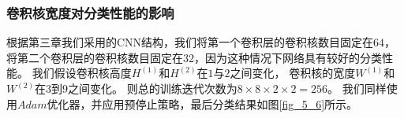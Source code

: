 \subsubsection{卷积核宽度对分类性能的影响}
根据第三章我们采用的CNN结构，我们将第一个卷积层的卷积核数目固定在$64$，
将第二个卷积层的卷积核数目固定在$32$，因为这种情况下网络具有较好的分类性能。
我们假设卷积核高度$H^{(1)}$和$H^{(2)}$在$1$与$2$之间变化，
卷积核的宽度$W^{(1)}$和$W^{(2)}$在$3$到$9$之间变化。
则总的训练迭代次数为$8 \times 8 \times 2 \times 2 = 256$。
我们同样使用$Adam$优化器，并应用预停止策略，最后分类结果如图\ref{fig_5_6}所示。\par
\begin{figure}[!h]
	\centering
	\\
\end{figure}
